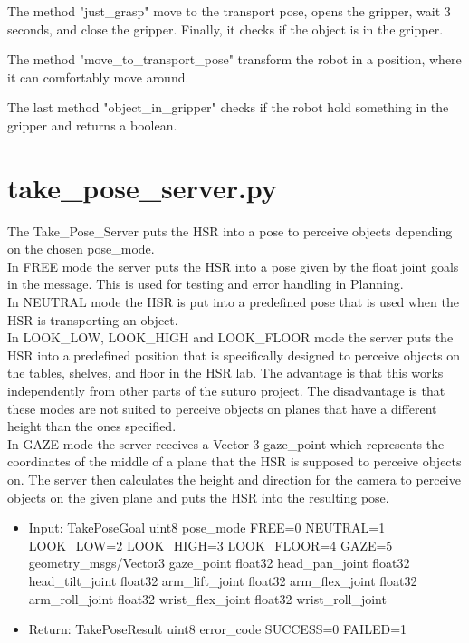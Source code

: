 \documentclass[main.tex]{subfiles}
\begin{document}
			\vspace{0,25 cm}
			The method "just\_grasp" move to the transport pose, opens the gripper, wait 3 seconds, and close the gripper. Finally, it checks if the object is in the gripper.
			
			\vspace{0,25 cm}
			The method "move\_to\_transport\_pose" transform the robot in a position, where it can comfortably move around.
			
			\vspace{0,25 cm}
			The last method "object\_in\_gripper" checks if the robot hold something in the gripper and returns a boolean.\\
			
			\section{take\_pose\_server.py} 
			
			The Take\_Pose\_Server puts the HSR into a pose to perceive objects depending on the chosen pose\_mode. \\
			In FREE mode the server puts the HSR into a pose given by the float joint goals in the message. This is used for testing and error handling in Planning. \\
			In NEUTRAL mode the HSR is put into a predefined pose that is used when the HSR is transporting an object. \\
			In LOOK\_LOW, LOOK\_HIGH and LOOK\_FLOOR mode the server puts the HSR into a predefined position that is specifically designed to perceive objects on the tables, shelves, and floor in the HSR lab. The advantage is that this works independently from other parts of the suturo project. The disadvantage is that these modes are not suited to perceive objects on planes that have a different height than the ones specified. \\
			In GAZE mode the server receives a Vector 3 gaze\_point which represents the coordinates of the middle of a plane that the HSR is supposed to perceive objects on. The server then calculates the height and direction for the camera to perceive objects on the given plane and puts the HSR into the resulting pose.
			
			\begin{itemize}
				\item Input: TakePoseGoal 
				\subitem uint8 pose\_mode
				\subsubitem FREE=0
				\subsubitem NEUTRAL=1
				\subsubitem LOOK\_LOW=2
				\subsubitem LOOK\_HIGH=3
				\subsubitem LOOK\_FLOOR=4
				\subsubitem GAZE=5
				\subitem geometry\_msgs/Vector3 gaze\_point
				\subitem float32 head\_pan\_joint
				\subitem float32 head\_tilt\_joint
				\subitem float32 arm\_lift\_joint
				\subitem float32 arm\_flex\_joint
				\subitem float32 arm\_roll\_joint
				\subitem float32 wrist\_flex\_joint
				\subitem float32 wrist\_roll\_joint
				\item Return: TakePoseResult
				\subitem uint8 error\_code 
				\subsubitem SUCCESS=0
				\subsubitem FAILED=1
			\end{itemize}
			
\end{document}
